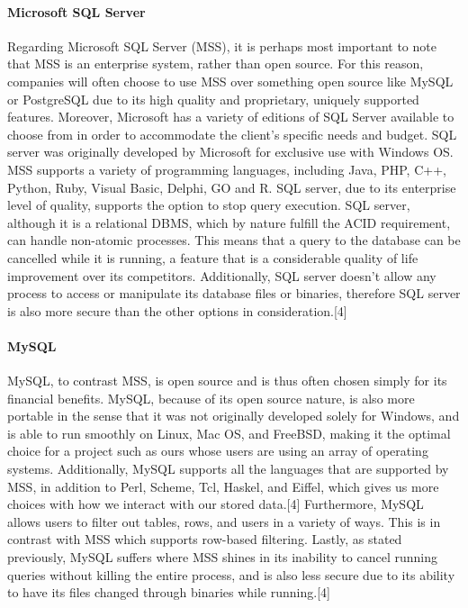 \documentclass[onecolumn, draftclsnofoot,10pt, compsoc]{IEEEtran}
\begin{document}
\paragraph{Microsoft SQL Server}
Regarding Microsoft SQL Server (MSS), it is perhaps most important to note that MSS is an enterprise system, rather than open source. For this reason, companies will often choose to use MSS over something open source like MySQL or PostgreSQL due to its high quality and proprietary, uniquely supported features. Moreover, Microsoft has a variety of editions of SQL Server available to choose from in order to accommodate the client's specific needs and budget. SQL server was originally developed by Microsoft for exclusive use with Windows OS. MSS supports a variety of programming languages, including Java, PHP, C++, Python, Ruby, Visual Basic, Delphi, GO and R. SQL server, due to its enterprise level of quality, supports the option to stop query execution. SQL server, although it is a relational DBMS, which by nature fulfill the ACID requirement, can handle non-atomic processes. This means that a query to the database can be cancelled while it is running, a feature that is a considerable quality of life improvement over its competitors. Additionally, SQL server doesn't allow any process to access or manipulate its database files or binaries, therefore SQL server is also more secure than the other options in consideration.[4]

\paragraph{MySQL}
MySQL, to contrast MSS, is open source and is thus often chosen simply for its financial benefits. MySQL, because of its open source nature, is also more portable in the sense that it was not originally developed solely for Windows, and is able to run smoothly on Linux, Mac OS, and FreeBSD, making it the optimal choice for a project such as ours whose users are using an array of operating systems. Additionally, MySQL supports all the languages that are supported by MSS, in addition to Perl, Scheme, Tcl, Haskel, and Eiffel, which gives us more choices with how we interact with our stored data.[4] Furthermore, MySQL allows users to filter out tables, rows, and users in a variety of ways. This is in contrast with MSS which supports row-based filtering. Lastly, as stated previously, MySQL suffers where MSS shines in its inability to cancel running queries without killing the entire process, and is also less secure due to its ability to have its files changed through binaries while running.[4]
\end{document}

